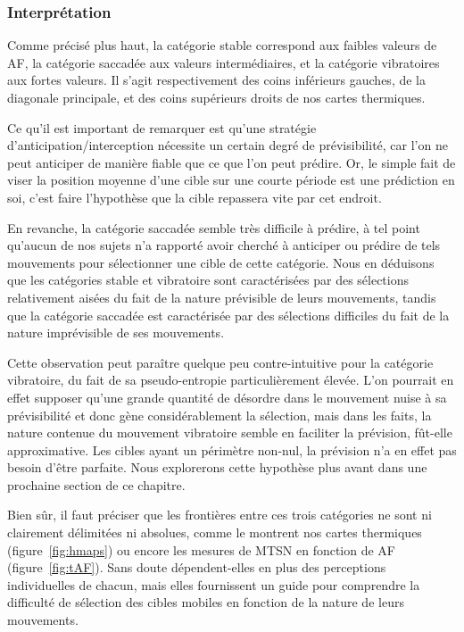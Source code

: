 	\subsubsection{Interprétation}
	Comme précisé plus haut, la catégorie stable correspond aux faibles valeurs de AF, la catégorie saccadée aux valeurs intermédiaires, et la catégorie vibratoires aux fortes valeurs. Il s'agit respectivement des coins inférieurs gauches, de la diagonale principale, et des coins supérieurs droits de nos cartes thermiques.
	
	Ce qu'il est important de remarquer est qu'une stratégie d'anticipation/interception nécessite un certain degré de prévisibilité, car l'on ne peut anticiper de manière fiable que ce que l'on peut prédire. Or, le simple fait de viser la \og position moyenne \fg{} d'une cible sur une courte période est une prédiction en soi, c'est faire l'hypothèse que la cible repassera vite par cet endroit.
	
	En revanche, la catégorie saccadée semble très difficile à prédire, à tel point qu'aucun de nos sujets n'a rapporté avoir cherché à anticiper ou prédire de tels mouvements pour sélectionner une cible de cette catégorie. Nous en déduisons que les catégories stable et vibratoire sont caractérisées par des sélections relativement aisées du fait de la nature prévisible de leurs mouvements, tandis que la catégorie saccadée est caractérisée par des sélections difficiles du fait de la nature imprévisible de ses mouvements.
	
	Cette observation peut paraître quelque peu contre-intuitive pour la catégorie vibratoire, du fait de sa pseudo-entropie particulièrement élevée. L'on pourrait en effet supposer qu'une grande quantité de désordre dans le mouvement nuise à sa prévisibilité et donc gène considérablement la sélection, mais dans les faits, la nature \og contenue \fg{} du mouvement vibratoire semble en faciliter la prévision, fût-elle approximative. Les cibles ayant un périmètre non-nul, la prévision n'a en effet pas besoin d'être parfaite. Nous explorerons cette hypothèse plus avant dans une prochaine section de ce chapitre.
	
	Bien sûr, il faut préciser que les frontières entre ces trois catégories ne sont ni clairement délimitées ni absolues, comme le montrent nos cartes thermiques (figure~\ref{fig:hmaps}) ou encore les mesures de MTSN en fonction de AF (figure~\ref{fig:tAF}). Sans doute dépendent-elles en plus des perceptions individuelles de chacun, mais elles fournissent un guide pour comprendre la difficulté de sélection des cibles mobiles en fonction de la nature de leurs mouvements.
	
